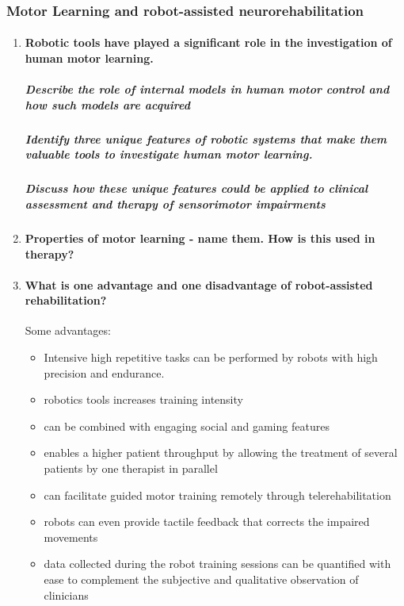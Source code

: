 \documentclass[12pt,article,oneside,a4paper]{memoir}
\begin{document}
\subsubsection{Motor Learning and robot-assisted neurorehabilitation}
\begin{enumerate}
\item \paragraph{Robotic tools have played a significant role in the investigation of human motor learning.}

\subparagraph{Describe the role of internal models in human motor control and
how such models are acquired}


\subparagraph{Identify three unique features of robotic systems that make them
valuable tools to investigate human motor learning.}


\subparagraph{Discuss how these unique features could be applied to clinical
assessment and therapy of sensorimotor impairments} 


\item \paragraph{Properties of motor learning - name them.  How is this used in therapy?}

\item \paragraph{What is one advantage and one disadvantage of robot-assisted
rehabilitation?}
Some advantages:
\begin{itemize}
\item Intensive high repetitive tasks can be performed by robots with high
precision and endurance.
\item robotics tools increases training intensity
\item can be combined with engaging social and gaming features
\item enables a higher patient throughput by allowing the treatment of several
patients by one therapist in parallel
\item can facilitate guided motor training remotely through telerehabilitation
\item robots can even provide tactile feedback that corrects the impaired
movements
\item data collected during the robot training sessions can be quantified with
ease to complement the subjective and qualitative observation of clinicians
\end{itemize}


\end{enumerate}
\end{document}
